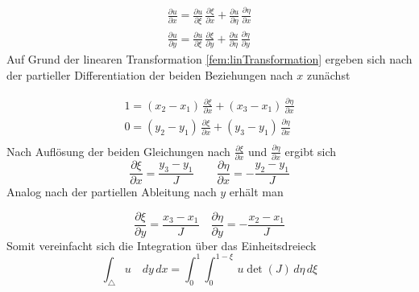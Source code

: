 \begin{equation}
\begin{split}
	\frac{\partial u}{\partial x} = \frac{\partial u}{\partial \xi} \, \frac{\partial \xi}{\partial x} + \frac{\partial u}{\partial \eta} \, \frac{\partial \eta}{\partial x} \\
	\frac{\partial u}{\partial y} = \frac{\partial u}{\partial \xi} \, \frac{\partial \xi}{\partial y} + \frac{\partial u}{\partial \eta} \, \frac{\partial \eta}{\partial y}
	\end{split}
\end{equation}
Auf Grund der linearen Transformation \eqref{fem:linTransformation} ergeben sich nach der partieller Differentiation der beiden Beziehungen nach $x$ zunächst

\begin{equation}
			\begin{aligned}
			1  = (x_2 -x_1) \, \frac{\partial \xi}{\partial x} + (x_3 -x_1) \, \frac{\partial \eta}{\partial x} \\
			0 = (y_2 -y_1) \, \frac{\partial \xi}{\partial x} + (y_3 -y_1) \, \frac{\partial \eta}{\partial x} \\
			 \end{aligned}
\end{equation}
Nach Auflösung  der beiden Gleichungen nach $\frac{\partial \xi}{\partial x}$ und $\frac{\partial \eta}{\partial x}$ ergibt sich
\begin{equation}
			\frac{\partial \xi}{\partial x} = \frac{y_3 - y_1}{J} \qquad \frac{\partial \eta}{\partial x} = -\frac{y_2 - y_1}{J}
\end{equation}
Analog nach der partiellen Ableitung nach $y$ erhält man

\begin{equation}
			\frac{\partial \xi}{\partial y} = \frac{x_3 - x_1}{J} \quad \frac{\partial \eta}{\partial y} = -\frac{x_2 - x_1}{J}
\end{equation}
Somit vereinfacht sich die Integration über das Einheitsdreieck 
\begin{equation}
			\int_{\triangle} u \quad dy \, dx = \int_0^1 \int_0^{1 - \xi} \, u \det (J) \, d \eta \, d \xi
\end{equation}

